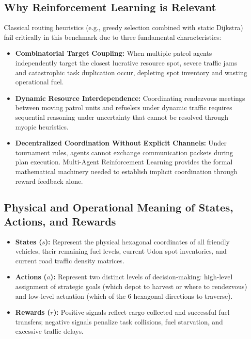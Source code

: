 \documentclass[11pt,a4paper]{article}
\begin{document}
\subsection{Why Reinforcement Learning is Relevant}
Classical routing heuristics (e.g., greedy selection combined with static Dijkstra) fail critically in this benchmark due to three fundamental characteristics:
\begin{itemize}
    \item \textbf{Combinatorial Target Coupling:} When multiple patrol agents independently target the closest lucrative resource spot, severe traffic jams and catastrophic task duplication occur, depleting spot inventory and wasting operational fuel.
    \item \textbf{Dynamic Resource Interdependence:} Coordinating rendezvous meetings between moving patrol units and refuelers under dynamic traffic requires sequential reasoning under uncertainty that cannot be resolved through myopic heuristics.
    \item \textbf{Decentralized Coordination Without Explicit Channels:} Under tournament rules, agents cannot exchange communication packets during plan execution. Multi-Agent Reinforcement Learning provides the formal mathematical machinery needed to establish implicit coordination through reward feedback alone.
\end{itemize}

\subsection{Physical and Operational Meaning of States, Actions, and Rewards}
\begin{itemize}
    \item \textbf{States ($s$):} Represent the physical hexagonal coordinates of all friendly vehicles, their remaining fuel levels, current Udon spot inventories, and current road traffic density matrices.
    \item \textbf{Actions ($a$):} Represent two distinct levels of decision-making: high-level assignment of strategic goals (which depot to harvest or where to rendezvous) and low-level actuation (which of the 6 hexagonal directions to traverse).
    \item \textbf{Rewards ($r$):} Positive signals reflect cargo collected and successful fuel transfers; negative signals penalize task collisions, fuel starvation, and excessive traffic delays.
\end{itemize}
\end{document}
